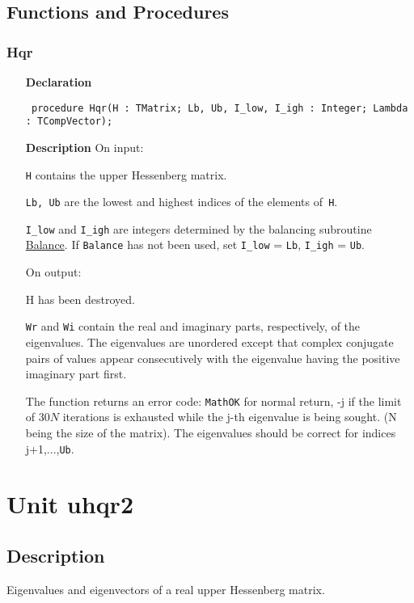 \documentclass[12pt,a4paper,oneside]{report}
\newcommand{\declarationitem}[1]{\textbf{#1}}
\newcommand{\descriptiontitle}[1]{\textbf{#1}}
\newcommand{\code}[1]{\texttt{#1}}
\begin{document}
\subsection{Functions and Procedures}
\subsubsection{Hqr}
\label{uhqr-Hqr}
\begin{itemize}\item[\declarationitem{Declaration}\hfill]
	\begin{flushleft}
		\code{
			procedure Hqr(H : TMatrix; Lb, Ub, I{\_}low, I{\_}igh : Integer; Lambda : TCompVector);}
		
	\end{flushleft}
	
	\par
	\item[\descriptiontitle{Description}]
	On input:
	
	\code{H} contains the upper Hessenberg matrix.
	
	\code{Lb, Ub} are the lowest and highest indices of the elements of\code{ H}.
	
	\code{I{\_}low} and \code{I{\_}igh} are integers determined by the balancing subroutine \hyperref[ubalance]{Balance}. If \code{Balance} has not been used, set \code{I{\_}low} = \code{Lb}, \code{I{\_}igh} = \code{Ub}.
	
	On output:
	
	H has been destroyed.
	
	\code{Wr} and \code{Wi} contain the real and imaginary parts, respectively, of the eigenvalues. The eigenvalues are unordered except that complex conjugate pairs of values appear consecutively with the eigenvalue having the positive imaginary part first.
	
	The function returns an error code: \code{MathOK} for normal return, {-}j if the limit of $30N$ iterations is exhausted while the j{-}th eigenvalue is being sought. (N being the size of the matrix). The eigenvalues should be correct for indices j+1,...,\code{Ub}.
	
\end{itemize}
\section{Unit uhqr2}
\label{uhqr2}
\subsection{Description}
Eigenvalues and eigenvectors of a real upper Hessenberg matrix.
\end{document}
